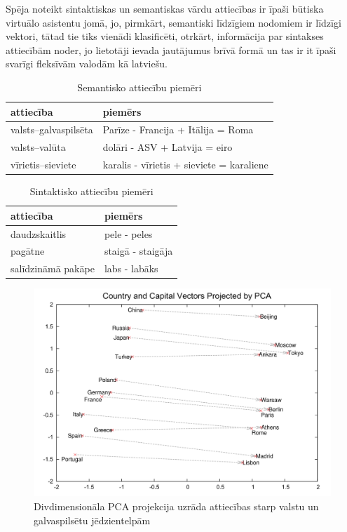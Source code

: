 Spēja noteikt sintaktiskas un semantiskas vārdu attiecības ir īpaši būtiska virtuālo asistentu jomā, jo, pirmkārt, semantiski līdzīgiem nodomiem ir līdzīgi vektori, tātad tie tiks vienādi klasificēti, otrkārt, informācija par sintakses attiecībām noder, jo lietotāji ievada jautājumus brīvā formā un tas ir it īpaši svarīgi fleksīvām valodām kā latviešu.



\begin{table}[htbp]
	\centering
	\caption{Semantisko attiecību piemēri \cite{word2vec2013}}
	\begin{tabular}{ll}\toprule
		attiecība & piemērs  \\\midrule
		valsts--galvaspilsēta   & Parīze - Francija + Itālija = Roma \\
		valsts--valūta   & dolāri - ASV + Latvija = eiro \\
		vīrietis--sieviete   & karalis - vīrietis + sieviete = karaliene \\\bottomrule
	\end{tabular}%
	\label{tab:semantic-relationship-examples}%
\end{table}

\begin{table}[htbp]
	\centering
	\caption{Sintaktisko attiecību piemēri \cite{word2vec2013}}
	\begin{tabular}{ll}\toprule
		attiecība & piemērs  \\\midrule
		daudzskaitlis   & pele - peles \\
		pagātne   & staigā - staigāja \\
		salīdzināmā pakāpe   & labs - labāks \\\bottomrule
	\end{tabular}%
	\label{tab:sintactic-relationship-examples}%
\end{table}


\begin{figure}[h]
	\centering
	\includegraphics[width=\textwidth]{figures/word2vec-country-capital.png}
	\caption{Divdimensionāla PCA projekcija uzrāda attiecības starp valstu un galvaspilsētu jēdzientelpām \cite{colyer2016}}
	\label{fig:country-capital}%
\end{figure}

